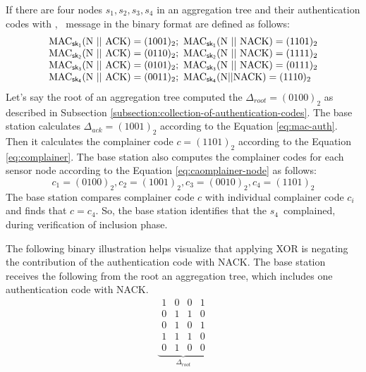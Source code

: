 		\begin{exmp} 
			If there are four nodes ${s_{1},s_{2},s_{3},s_{4}}$ in an aggregation tree and their authentication codes with \ack, \nack\ message in the binary format are defined as follows:
			\begin{equation*}
				\begin{array}{l}
					\mbox{MAC}_{\sf{sk}_{1}}(\mbox{N}\ ||\ \mbox{ACK}) = (1001)_{2};\ \mbox{MAC}_{\sf{sk}_{1}}(\mbox{N}\ ||\ \mbox{NACK}) = (1101)_{2}\\
					\mbox{MAC}_{\sf{sk}_{2}}(\mbox{N}\ ||\ \mbox{ACK}) = (0110)_{2};\ \mbox{MAC}_{\sf{sk}_{2}}(\mbox{N}\ ||\ \mbox{NACK}) = (1111)_{2}\\	
					\mbox{MAC}_{\sf{sk}_{3}}(\mbox{N}\ ||\ \mbox{ACK}) = (0101)_{2};\ \mbox{MAC}_{\sf{sk}_{3}}(\mbox{N}\ ||\ \mbox{NACK}) = (0111)_{2}\\
					\mbox{MAC}_{\sf{sk}_{4}}(\mbox{N}\ ||\ \mbox{ACK}) = (0011)_{2};\ \mbox{MAC}_{\sf{sk}_{4}}(\mbox{N} || \mbox{NACK}) = (1110)_{2}
				\end{array}
			\end{equation*}
			Let's say the root of an aggregation tree computed the $\Delta_{root} = (0100)_{2}$ as described in Subsection \ref{subsection:collection-of-authentication-codes}.
			The base station calculates $\Delta_{ack} = (1001)_{2}$ according to the Equation \ref{eq:mac-auth}.
			Then it calculates the complainer code $c = (1101)_{2}$ according to the Equation \ref{eq:complainer}.
			The base station also computes the complainer codes for each sensor node according to the Equation \ref{eq:caomplainer-node} as follows:
			\begin{equation*}			
				c_{1} = (0100)_{2}, c_{2} = (1001)_{2}, c_{3} = (0010)_{2}, c_{4} = (1101)_{2}
			\end{equation*}
			The base station compares complainer code $c$ with individual complainer code $c_{i}$ and finds that $c=c_{4}$.
			So, the base station identifies that the $s_{4}$\ complained, during verification of inclusion phase.
		\end{exmp}
		The following binary illustration helps visualize that applying XOR is negating the contribution of the authentication code with NACK.
		The base station receives the following from the root an aggregation tree, which includes one authentication code with NACK.
		\[
			\underbrace{			
				\begin{array}{cccc}
					1 & 0 & 0 & 1 \\ 
					0 & 1 & 1 & 0 \\
					0 & 1 & 0 & 1 \\
					1 & 1 & 1 & 0 \\
					\hline
					0 & 1 & 0 & 0 
				\end{array}
				}_{\Delta_{root}}
		\]
